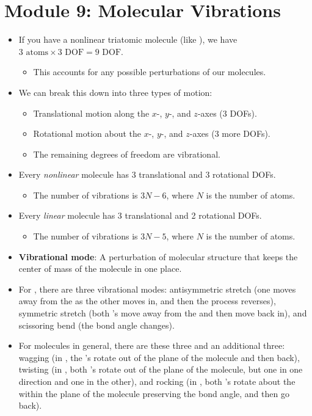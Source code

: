 \documentclass[../notes.tex]{subfiles}
\begin{document}
\section{Module 9: Molecular Vibrations}
\begin{itemize}
    \item {}If you have a nonlinear triatomic molecule (like ), we have $3\text{ atoms}\times 3\text{ DOF}=9\text{ DOF}$.
    \begin{itemize}
        \item This accounts for any possible perturbations of our molecules.
    \end{itemize}
    \item We can break this down into three types of motion:
    \begin{itemize}
        \item Translational motion along the $x$-, $y$-, and $z$-axes (3 DOFs).
        \item Rotational motion about the $x$-, $y$-, and $z$-axes (3 more DOFs).
        \item The remaining degrees of freedom are vibrational.
    \end{itemize}
    \item Every \emph{nonlinear} molecule has 3 translational and 3 rotational DOFs.
    \begin{itemize}
        \item The number of vibrations is $3N-6$, where $N$ is the number of atoms.
    \end{itemize}
    \item Every \emph{linear} molecule has 3 translational and 2 rotational DOFs.
    \begin{itemize}
        \item The number of vibrations is $3N-5$, where $N$ is the number of atoms.
    \end{itemize}
    \item \textbf{Vibrational mode}: A perturbation of molecular structure that keeps the center of mass of the molecule in one place.
    \item For , there are three vibrational modes: antisymmetric stretch (one  moves away from the  as the other moves in, and then the process reverses), symmetric stretch (both 's move away from the  and then move back in), and scissoring bend (the bond angle changes).
    \item For molecules in general, there are these three and an additional three: wagging (in , the 's rotate out of the plane of the molecule and then back), twisting (in , both 's rotate out of the plane of the molecule, but one in one direction and one in the other), and rocking (in , both 's rotate about the  within the plane of the molecule preserving the bond angle, and then go back).

\end{itemize}
\end{document}
